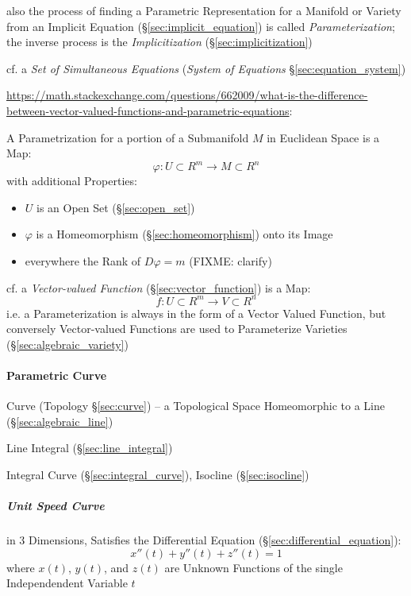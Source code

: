 also the process of finding a Parametric Representation for a Manifold or
Variety from an Implicit Equation (\S\ref{sec:implicit_equation}) is called
\emph{Parameterization}; the inverse process is the \emph{Implicitization}
(\S\ref{sec:implicitization})

cf. a \emph{Set of Simultaneous Equations} (\emph{System of Equations}
\S\ref{sec:equation_system})

\url{https://math.stackexchange.com/questions/662009/what-is-the-difference-between-vector-valued-functions-and-parametric-equations}:

A Parametrization for a portion of a Submanifold $M$ in Euclidean Space is a
Map:
\[
  \varphi : U \subset R^m \rightarrow M \subset R^n
\]
with additional Properties:
\begin{itemize}
  \item $U$ is an Open Set (\S\ref{sec:open_set})
  \item $\varphi$ is a Homeomorphism (\S\ref{sec:homeomorphism}) onto its Image
  \item everywhere the Rank of $D\varphi = m$ (FIXME: clarify)
\end{itemize}

\fist cf. a \emph{Vector-valued Function} (\S\ref{sec:vector_function}) is a
Map:
\[
  f : U \subset R^m \rightarrow V \subset R^n
\]
i.e. a Parameterization is always in the form of a Vector Valued Function, but
conversely Vector-valued Functions are used to Parameterize Varieties
(\S\ref{sec:algebraic_variety}) %



\paragraph{Parametric Curve}\label{sec:parametric_curve}\hfill

\fist Curve (Topology \S\ref{sec:curve}) -- a Topological Space Homeomorphic to
a Line (\S\ref{sec:algebraic_line})

Line Integral (\S\ref{sec:line_integral})

Integral Curve (\S\ref{sec:integral_curve}), Isocline (\S\ref{sec:isocline})



\subparagraph{Unit Speed Curve}\label{sec:unit_speed_curve}\hfill

in 3 Dimensions, Satisfies the Differential Equation
(\S\ref{sec:differential_equation}):
\[
  x''(t) + y''(t) + z''(t) = 1
\]
where $x(t)$, $y(t)$, and $z(t)$ are Unknown Functions of the single
Independendent Variable $t$



